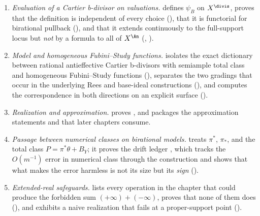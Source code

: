 \begin{enumerate}
\item\label{itm:ch38-task:evaluation}
 \emph{Evaluation of a Cartier b-divisor on valuations.}
  defines
 $\psi_B$ on $X^{\divis}$, proves that the definition is independent
 of every choice
 (), that it is functorial for
 birational pullback (), and that it
 extends continuously to the full-support locus but \emph{not} by a
 formula to all of $X^{\An}$
 (,
 ).
\item\label{itm:ch38-task:fs}
 \emph{Model and homogeneous Fubini--Study functions.}
  isolates the exact dictionary between rational
 antieffective Cartier b-divisors with semiample total class and
 homogeneous Fubini--Study functions
 (), separates the two gradings that
 occur in the underlying Rees and base-ideal constructions
 (), and computes the correspondence in both
 directions on an explicit surface
 ().
\item\label{itm:ch38-task:realization}
 \emph{Realization and approximation.}
  proves
 , and
  packages the approximation statements
  and
  that later chapters consume.
\item\label{itm:ch38-task:classes}
 \emph{Passage between numerical classes on birational models.}
  treats $\pi^*$, $\pi_*$, and the total class
 $P=\pi^*\theta+B_Y$; it proves the drift ledger
 , which tracks the $O(m^{-1})$ error in
 numerical class through the construction and shows that what makes the
 error harmless is not its size but its \emph{sign}
 ().
\item\label{itm:ch38-task:extended}
 \emph{Extended-real safeguards.}   lists every
 operation in the chapter that could produce the forbidden sum
 $(+\infty)+(-\infty)$, proves that none of them does
 (), and exhibits a naive realization that
 fails at a proper-support point
 ().
\end{enumerate}

